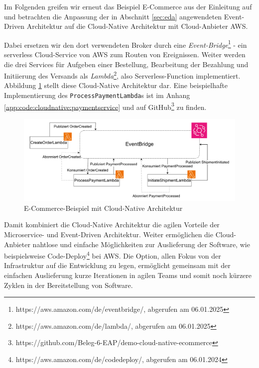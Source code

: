 \documentclass[acmtog]{acmart}
\begin{document}
Im Folgenden greifen wir erneut das Beispiel E-Commerce aus der Einleitung auf und betrachten die Anpassung der in
Abschnitt \ref{sec:eda} angewendeten Event-Driven Architektur auf die Cloud-Native Architektur mit Cloud-Anbieter AWS\@.

Dabei ersetzen wir den dort verwendeten Broker durch eine \textit{Event-Bridge}\footnote{https://aws.amazon.com/de/eventbridge/, abgerufen am 06.01.2025}
- ein serverless Cloud-Service von AWS zum Routen von Ereignissen.
Weiter werden die drei Services für Aufgeben einer Bestellung, Bearbeitung der Bezahlung und Initiierung des Versands als \textit{Lambda}\footnote{https://aws.amazon.com/de/lambda/, abgerufen am 06.01.2025},
also Serverless-Function implementiert.
Abbildung \ref{fig:cloudnativeecommerce} stellt diese Cloud-Native Architektur dar.
Eine beispielhafte Implementierung des \texttt{ProcessPaymentLambda}s ist im Anhang \ref{app:code:cloudnative:paymentservice} und auf GitHub\footnote{https://github.com/Beleg-6-EAP/demo-cloud-native-ecommerce} zu finden.
\begin{figure}[!h]
  \centering
  \includegraphics[width=\linewidth]{images/cloud-native/cloud-native-ecommerce.drawio}
  \caption{E-Commerce-Beispiel mit Cloud-Native Architektur}
  \label{fig:cloudnativeecommerce}
\end{figure}

Damit kombiniert die Cloud-Native Architektur die agilen Vorteile der Microservice- und Event-Driven Architektur.
Weiter ermöglichen die Cloud-Anbieter nahtlose und einfache Möglichkeiten zur Auslieferung der Software,
wie beispielsweise Code-Deploy\footnote{https://aws.amazon.com/de/codedeploy/, abgerufen am 06.01.2024} bei AWS\@.
Die Option, allen Fokus von der Infrastruktur auf die Entwicklung zu legen, ermöglicht gemeinsam mit der einfachen Auslieferung kurze Iterationen in agilen Teams
und somit noch kürzere Zyklen in der Bereitstellung von Software.
\end{document}
